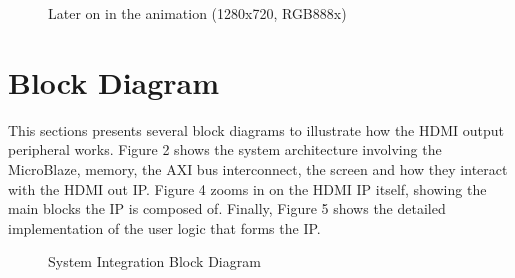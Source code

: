 \documentclass[12pt]{article}
\begin{document}
\begin{enumerate}
\begin{figure}[h!]
      \end{figure}
      \newpage
      \begin{figure}[h!]
        \centering
        \caption{Later on in the animation (1280x720, RGB888x)}
      \end{figure}
  \end{enumerate}
  \section{Block Diagram}
  This sections presents several block diagrams to illustrate how the HDMI output peripheral
  works. Figure 2 shows the system architecture involving the MicroBlaze,
  memory, the AXI bus interconnect, the screen and how they interact with the HDMI out IP.
  Figure 4 zooms in on the HDMI IP itself, showing the main blocks the IP is
  composed of. Finally, Figure 5 shows the detailed implementation of the
  user logic that forms the IP.
	\begin{figure}
	\centering
	\caption{System Integration Block Diagram}
	\end{figure}
\end{document}
